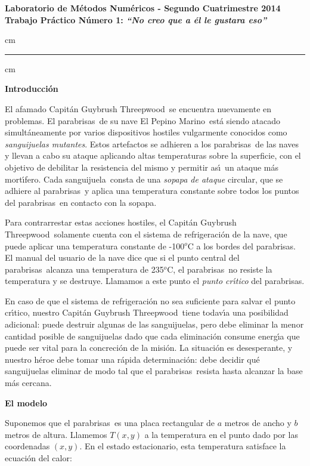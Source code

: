 \documentclass[11pt, a4paper]{article}
\newcommand{\atacante}{sanguijuela}
\newcommand{\capitan}{Capit\'an Guybrush Threepwood}
\newcommand{\objeto}{parabrisas}
\newcommand{\nave}{El Pepino Marino}
\begin{document}
\begin{centering}
\large\bf Laboratorio de M\'etodos Num\'ericos - Segundo Cuatrimestre 2014 \\
\large\bf Trabajo Pr\'actico N\'umero 1: \emph{``No creo que a \'el le gustara eso''}\\
\end{centering}


 cm
\hrule
{} cm

{\noindent \bf Introducci\'on}

El afamado \capitan\ se encuentra nuevamente en problemas. El
\objeto\ de su nave \nave\ est\'a siendo atacado simult\'aneamente por varios
dispositivos hostiles vulgarmente conocidos como \emph{\atacante s
mutantes}. Estos artefactos se adhieren a los \objeto\ de las naves y
llevan a cabo su ataque aplicando altas temperaturas sobre la superficie, con
el objetivo de debilitar la resistencia del mismo y permitir as\'\i \
un ataque m\'as mort\'\i fero. Cada \atacante\ consta de una \emph{sopapa
de ataque} circular, que se adhiere al \objeto\ y aplica una temperatura
constante sobre todos los puntos del \objeto\ en contacto con la sopapa.

Para con\-tra\-rres\-tar estas acciones hostiles, el \capitan\ 
solamente cuenta con el sistema de refrigeraci\'on de la nave, que puede
aplicar una temperatura constante de -100${}^o$C a los bordes del \objeto.
El manual del usuario de la nave dice que si el punto central del \objeto\ 
alcanza una temperatura de 235${}^o$C, el \objeto\ no resiste la temperatura
y se destruye. Llamamos a este punto el \emph{punto cr\'\i tico} del
\objeto.

En caso de que el sistema de refrigeraci\'on no sea suficiente para salvar
el punto cr\'\i tico, nues\-tro \capitan\ tiene todav\'\i a una posibilidad
adicional: puede des\-tru\-ir algunas de las \atacante s, pero debe eliminar la
menor cantidad posible de \atacante s dado que cada eliminaci\'on consume
energ\'\i a que puede ser vital para la concreci\'on de la misi\'on.
La situaci\'on es desesperante, y nuestro h\'eroe debe tomar una r\'apida
determinaci\'on: debe decidir qu\'e \atacante s eliminar de modo tal que el
\objeto\ resista hasta alcanzar la base m\'as cercana.

{\noindent \bf El modelo}

Suponemos que el \objeto\ es una placa rectangular de $a$ metros de ancho y $b$ metros de altura. Llamemos $T(x,y)$ a la temperatura en el punto dado por las coordenadas $(x,y)$. En el estado estacionario, esta temperatura satisface la ecuaci\'on del calor:
\end{document}
